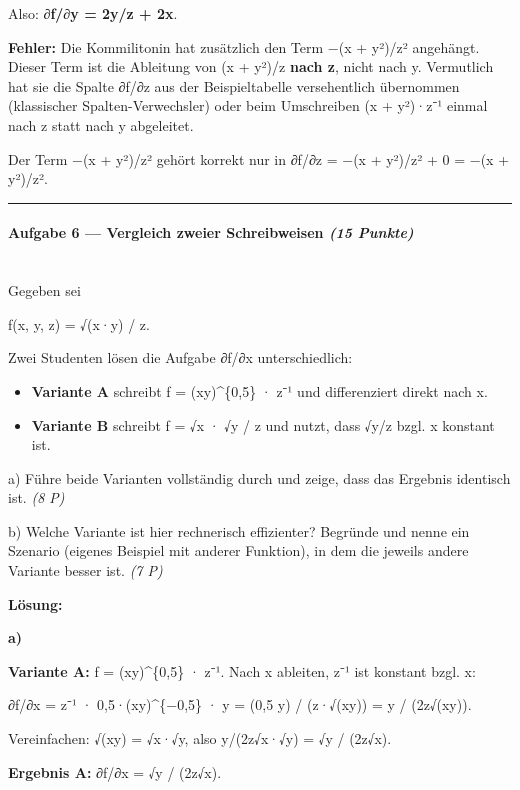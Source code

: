 \documentclass[11pt, a4paper]{article}
\begin{document}
Also: \textbf{∂f/∂y = 2y/z + 2x}.


\textbf{Fehler:} Die Kommilitonin hat zusätzlich den Term −(x + y²)/z² angehängt. Dieser Term ist die Ableitung von (x + y²)/z \textbf{nach z}, nicht nach y. Vermutlich hat sie die Spalte ∂f/∂z aus der Beispieltabelle versehentlich übernommen (klassischer Spalten-Verwechsler) oder beim Umschreiben (x + y²)·z⁻¹ einmal nach z statt nach y abgeleitet.


Der Term −(x + y²)/z² gehört korrekt nur in ∂f/∂z = −(x + y²)/z² + 0 = −(x + y²)/z².



\noindent\textcolor{rulegray}{\rule{\linewidth}{0.4pt}}


\paragraph{Aufgabe 6 — Vergleich zweier Schreibweisen \textit{(15 Punkte)}}\mbox{}\\[2pt]

Gegeben sei


f(x, y, z) = √(x·y) / z.


Zwei Studenten lösen die Aufgabe ∂f/∂x unterschiedlich:


\begin{itemize}
  \item \textbf{Variante A} schreibt f = (xy)\textasciicircum{}\{0,5\} · z⁻¹ und differenziert direkt nach x.
  \item \textbf{Variante B} schreibt f = √x · √y / z und nutzt, dass √y/z bzgl. x konstant ist.
\end{itemize}

a) Führe beide Varianten vollständig durch und zeige, dass das Ergebnis identisch ist. \textit{(8 P)}


b) Welche Variante ist hier rechnerisch effizienter? Begründe und nenne ein Szenario (eigenes Beispiel mit anderer Funktion), in dem die jeweils andere Variante besser ist. \textit{(7 P)}


\textbf{Lösung:}


\textbf{a)}


\textbf{Variante A:} f = (xy)\textasciicircum{}\{0,5\} · z⁻¹. Nach x ableiten, z⁻¹ ist konstant bzgl. x:


∂f/∂x = z⁻¹ · 0,5·(xy)\textasciicircum{}\{−0,5\} · y = (0,5 y) / (z·√(xy)) = y / (2z√(xy)).


Vereinfachen: √(xy) = √x·√y, also y/(2z√x·√y) = √y / (2z√x).


\textbf{Ergebnis A:} ∂f/∂x = √y / (2z√x).
\end{document}
